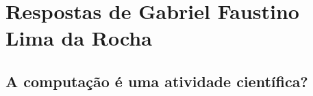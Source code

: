 \section{Respostas de Gabriel Faustino Lima da Rocha}

\subsection{A computação é uma atividade científica?}

